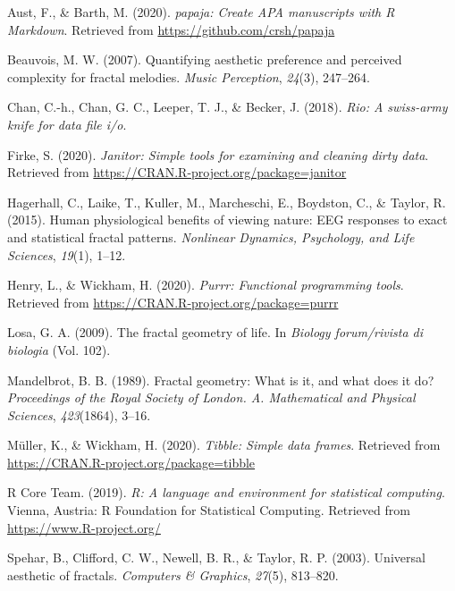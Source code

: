 \documentclass[english,jou]{apa6}
\begin{document}
\begingroup
\setlength{\parindent}{-0.5in}
\setlength{\leftskip}{0.5in}

\hypertarget{refs}{}
\leavevmode\hypertarget{ref-R-papaja}{}%
Aust, F., \& Barth, M. (2020). \emph{papaja: Create APA manuscripts with R Markdown}. Retrieved from \url{https://github.com/crsh/papaja}

\leavevmode\hypertarget{ref-beauvois2007quantifying}{}%
Beauvois, M. W. (2007). Quantifying aesthetic preference and perceived complexity for fractal melodies. \emph{Music Perception}, \emph{24}(3), 247--264.

\leavevmode\hypertarget{ref-R-rio}{}%
Chan, C.-h., Chan, G. C., Leeper, T. J., \& Becker, J. (2018). \emph{Rio: A swiss-army knife for data file i/o}.

\leavevmode\hypertarget{ref-R-janitor}{}%
Firke, S. (2020). \emph{Janitor: Simple tools for examining and cleaning dirty data}. Retrieved from \url{https://CRAN.R-project.org/package=janitor}

\leavevmode\hypertarget{ref-hagerhall2015human}{}%
Hagerhall, C., Laike, T., Kuller, M., Marcheschi, E., Boydston, C., \& Taylor, R. (2015). Human physiological benefits of viewing nature: EEG responses to exact and statistical fractal patterns. \emph{Nonlinear Dynamics, Psychology, and Life Sciences}, \emph{19}(1), 1--12.

\leavevmode\hypertarget{ref-R-purrr}{}%
Henry, L., \& Wickham, H. (2020). \emph{Purrr: Functional programming tools}. Retrieved from \url{https://CRAN.R-project.org/package=purrr}

\leavevmode\hypertarget{ref-losa2009fractal}{}%
Losa, G. A. (2009). The fractal geometry of life. In \emph{Biology forum/rivista di biologia} (Vol. 102).

\leavevmode\hypertarget{ref-mandelbrot1989fractal}{}%
Mandelbrot, B. B. (1989). Fractal geometry: What is it, and what does it do? \emph{Proceedings of the Royal Society of London. A. Mathematical and Physical Sciences}, \emph{423}(1864), 3--16.

\leavevmode\hypertarget{ref-R-tibble}{}%
Müller, K., \& Wickham, H. (2020). \emph{Tibble: Simple data frames}. Retrieved from \url{https://CRAN.R-project.org/package=tibble}

\leavevmode\hypertarget{ref-R-base}{}%
R Core Team. (2019). \emph{R: A language and environment for statistical computing}. Vienna, Austria: R Foundation for Statistical Computing. Retrieved from \url{https://www.R-project.org/}

\leavevmode\hypertarget{ref-spehar2003universal}{}%
Spehar, B., Clifford, C. W., Newell, B. R., \& Taylor, R. P. (2003). Universal aesthetic of fractals. \emph{Computers \& Graphics}, \emph{27}(5), 813--820.
\end{document}
